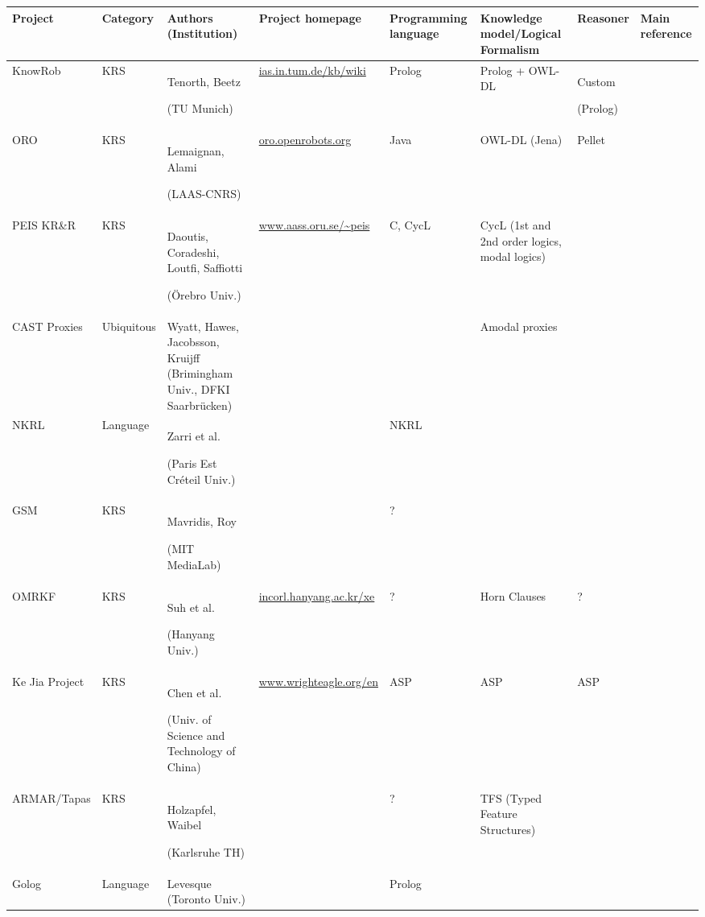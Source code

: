 \begin{landscape}
\begin{table}\footnotesize
\begin{center}

\begin{tabular}{p{2.2cm}p{1.6cm}p{4cm}lp{2.4cm}p{3.4cm}p{2.8cm}p{1.5cm}}
\toprule
{\bf Project} & {\bf Category} & {\bf Authors (Institution)} & {\bf Project homepage} & {\bf Programming language} & {\bf Knowledge model/Logical Formalism} & {\bf Reasoner} & Main reference \\
\midrule
{\sc KnowRob} & KRS & Tenorth, Beetz \par (TU Munich) & \url{ias.in.tum.de/kb/wiki} & {\sc Prolog} & {\sc Prolog} + OWL-DL & Custom \par ({\sc Prolog}) & \cite{Tenorth2009a} \\
ORO & KRS & Lemaignan, Alami \par (LAAS-CNRS) & \url{oro.openrobots.org} & {\sc Java} & OWL-DL ({\sc Jena}) & {\sc Pellet} & \cite{Lemaignan2010} \\
PEIS KR\&R & KRS & Daoutis, Coradeshi, Loutfi, Saffiotti \par (Örebro Univ.) & \url{www.aass.oru.se/~peis} & {\sc C}, {\sc CycL} & CycL (1st and 2nd order logics, modal logics) & & \cite{Daoutis2009} \\
CAST Proxies & Ubiquitous & Wyatt, Hawes, Jacobsson, Kruijff (Brimingham Univ., DFKI Saarbrücken) & & & Amodal proxies & & \cite{Jacobsson2008} \\
NKRL & Language & Zarri et al. \par (Paris Est Créteil Univ.) & & NKRL & & & \cite{Sabri2011} \\
GSM & KRS & Mavridis, Roy \par (MIT MediaLab) & & ? & & & \cite{Mavridis2006} \\
OMRKF & KRS & Suh et al. \par (Hanyang Univ.) & \url{incorl.hanyang.ac.kr/xe} & ? & Horn Clauses & ? & \cite{Suh2007} \\
Ke Jia Project & KRS & Chen et al. \par (Univ. of Science and Technology of China) & \url{www.wrighteagle.org/en} & ASP & ASP & ASP & \cite{Chen2010} \\
ARMAR/Tapas & KRS & Holzapfel, Waibel \par (Karlsruhe TH) & & ? & TFS (Typed Feature Structures) & & \cite{Holzapfel2008}\\
Golog & Language & Levesque (Toronto Univ.) & & {\sc Prolog} & & & \\

\end{tabular}
\end{center}
\end{table}
\end{landscape}
